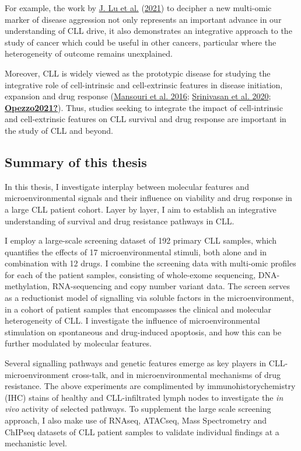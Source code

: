 \documentclass[11pt, a4paper, twosided]{book}
\begin{document}
For example, the work by \protect\hyperlink{ref-Lu2021}{J. Lu et al.} (\protect\hyperlink{ref-Lu2021}{2021}) to decipher a new multi-omic marker of disease aggression not only represents an important advance in our understanding of CLL drive, it also demonstrates an integrative approach to the study of cancer which could be useful in other cancers, particular where the heterogeneity of outcome remains unexplained.

Moreover, CLL is widely viewed as the prototypic disease for studying the integrative role of cell-intrinsic and cell-extrinsic features in disease initiation, expansion and drug response (\protect\hyperlink{ref-Mansouri2016}{Mansouri et al. 2016}; \protect\hyperlink{ref-Srinivasan2020}{Srinivasan et al. 2020}; \protect\hyperlink{ref-Opezzo2021}{\textbf{Opezzo2021?}}). Thus, studies seeking to integrate the impact of cell-intrinsic and cell-extrinsic features on CLL survival and drug response are important in the study of CLL and beyond.

\hypertarget{summary-of-this-thesis}{%
\subsection{Summary of this thesis}\label{summary-of-this-thesis}}

In this thesis, I investigate interplay between molecular features and microenvironmental signals and their influence on viability and drug response in a large CLL patient cohort. Layer by layer, I aim to establish an integrative understanding of survival and drug resistance pathways in CLL.

I employ a large-scale screening dataset of 192 primary CLL samples, which quantifies the effects of 17 microenvironmental stimuli, both alone and in combination with 12 drugs. I combine the screening data with multi-omic profiles for each of the patient samples, consisting of whole-exome sequencing, DNA-methylation, RNA-sequencing and copy number variant data. The screen serves as a reductionist model of signalling via soluble factors in the microenvironment, in a cohort of patient samples that encompasses the clinical and molecular heterogeneity of CLL. I investigate the influence of microenvironmental stimulation on spontaneous and drug-induced apoptosis, and how this can be further modulated by molecular features.

Several signalling pathways and genetic features emerge as key players in CLL-microenvironment cross-talk, and in microenvironmental mechanisms of drug resistance. The above experiments are complimented by immunohistorychemistry (IHC) stains of healthy and CLL-infiltrated lymph nodes to investigate the \emph{in vivo} activity of selected pathways. To supplement the large scale screening approach, I also make use of RNAseq, ATACseq, Mass Spectrometry and ChIPseq datasets of CLL patient samples to validate individual findings at a mechanistic level.
\end{document}

